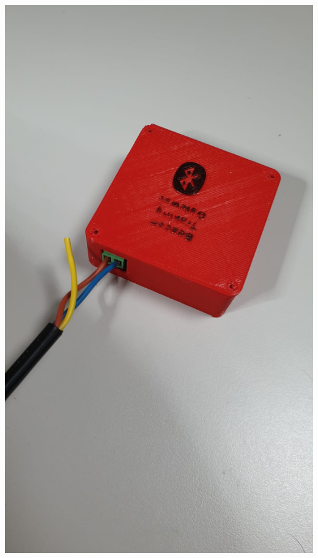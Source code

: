 \documentclass[a4paper ,12pt, onecolumn]{article}
\begin{document}
        \includegraphics[scale=0.1]{../3d_master_1.jpeg}
\end{document}
